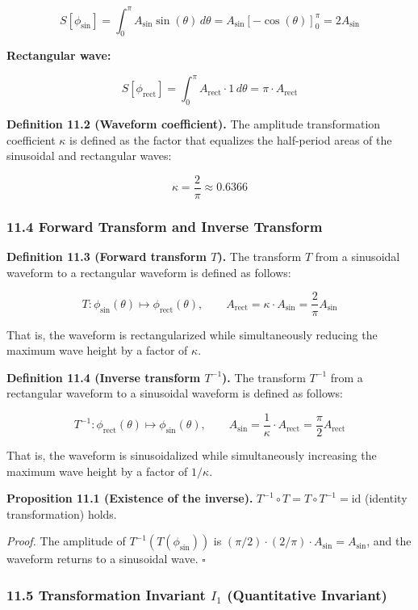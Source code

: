 \documentclass[a4paper,11pt]{article}
\begin{document}
\[S[\phi_{\sin}] = \int_0^{\pi} A_{\sin} \sin(\theta)\, d\theta = A_{\sin} \left[-\cos(\theta)\right]_0^{\pi} = 2A_{\sin} \tag{W4}\]

\textbf{Rectangular wave:}

\[S[\phi_{\text{rect}}] = \int_0^{\pi} A_{\text{rect}} \cdot 1\, d\theta = \pi \cdot A_{\text{rect}} \tag{W5}\]

\textbf{Definition 11.2 (Waveform coefficient).} The amplitude
transformation coefficient \(\kappa\) is defined as the factor that
equalizes the half-period areas of the sinusoidal and rectangular waves:

\[\kappa = \frac{2}{\pi} \approx 0.6366 \tag{W6}\]

\subsubsection{11.4 Forward Transform and Inverse
Transform}\label{forward-transform-and-inverse-transform}

\textbf{Definition 11.3 (Forward transform \(T\)).} The transform \(T\)
from a sinusoidal waveform to a rectangular waveform is defined as
follows:

\[T: \phi_{\sin}(\theta) \mapsto \phi_{\text{rect}}(\theta), \qquad A_{\text{rect}} = \kappa \cdot A_{\sin} = \frac{2}{\pi} A_{\sin} \tag{W7}\]

That is, the waveform is rectangularized while simultaneously reducing
the maximum wave height by a factor of \(\kappa\).

\textbf{Definition 11.4 (Inverse transform \(T^{-1}\)).} The transform
\(T^{-1}\) from a rectangular waveform to a sinusoidal waveform is
defined as follows:

\[T^{-1}: \phi_{\text{rect}}(\theta) \mapsto \phi_{\sin}(\theta), \qquad A_{\sin} = \frac{1}{\kappa} \cdot A_{\text{rect}} = \frac{\pi}{2} A_{\text{rect}} \tag{W8}\]

That is, the waveform is sinusoidalized while simultaneously increasing
the maximum wave height by a factor of \(1/\kappa\).

\textbf{Proposition 11.1 (Existence of the inverse).}
\(T^{-1} \circ T = T \circ T^{-1} = \mathrm{id}\) (identity
transformation) holds.

\emph{Proof.} The amplitude of \(T^{-1}(T(\phi_{\sin}))\) is
\((\pi/2) \cdot (2/\pi) \cdot A_{\sin} = A_{\sin}\), and the waveform
returns to a sinusoidal wave. \(\square\)

\subsubsection{\texorpdfstring{11.5 Transformation Invariant \(I_1\)
(Quantitative
Invariant)}{11.5 Transformation Invariant I\_1 (Quantitative Invariant)}}\label{transformation-invariant-i_1-quantitative-invariant}
\end{document}
